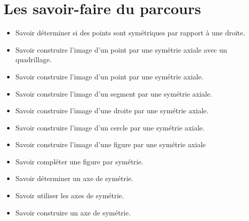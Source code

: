 \documentclass[a4paper,dvipsnames]{article}
\begin{document}
\section{Les savoir-faire du parcours}

\begin{CpsCol}
\begin{itemize}
\item Savoir déterminer si des points sont symétriques par rapport à une droite.
\item Savoir construire l'image d'un point par une symétrie axiale avec un quadrillage.
\item Savoir construire l'image d'un point par une symétrie axiale.
\item Savoir construire l'image d'un segment par une symétrie axiale.
\item Savoir construire l'image d'une droite par une symétrie axiale.
\item Savoir construire l'image d'un cercle par une symétrie axiale.
\item Savoir construire l'image d'une figure par une symétrie axiale
\item Savoir compléter une figure par symétrie.
\item Savoir déterminer un axe de symétrie.
\item Savoir utiliser les axes de symétrie.
\item Savoir construire un axe de symétrie.
\end{itemize}
\end{CpsCol}
\end{document}

